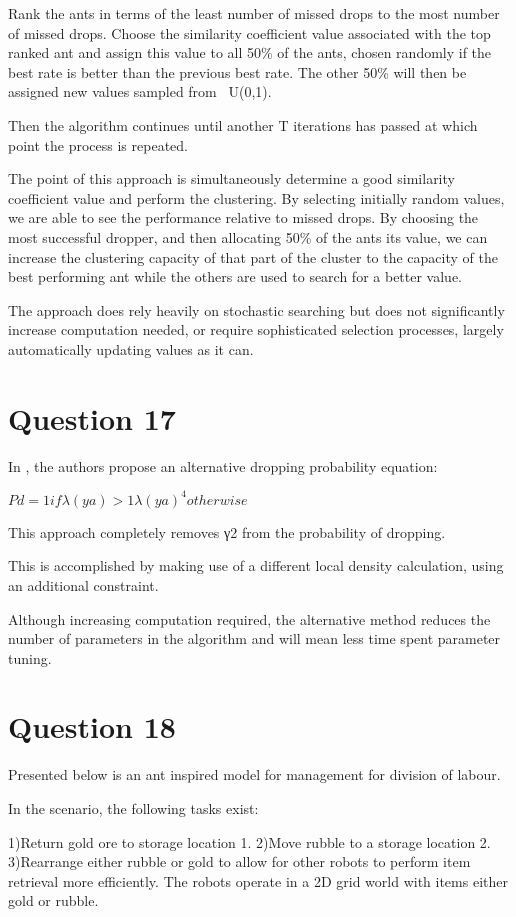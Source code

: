 \documentclass[12pt]{article}
\begin{document}
	Rank the ants in terms of the least number of missed drops to the most number of missed drops. Choose the similarity coefficient value associated with the top ranked ant and assign this value to all 50\% of the ants, chosen randomly if the best rate is better than the previous best rate. The other 50\% will then be assigned new values sampled from ~U(0,1).

	Then the algorithm continues until another T iterations has passed at which point the process is repeated.

	The point of this approach is simultaneously determine a good similarity coefficient value and perform the clustering. By selecting initially random values, we are able to see the performance relative to missed drops. By choosing the most successful dropper, and then allocating 50\% of the ants its value, we can increase the clustering capacity of that part of the cluster to the capacity of the best performing ant while the others are used to search for a better value.

	The approach does rely heavily on stochastic searching but does not significantly increase computation needed, or require sophisticated selection processes, largely automatically updating values as it can.
\section{Question 17}
In \cite{Handl03ant-basedclustering}, the authors propose an alternative dropping probability equation:

	$Pd={1         if λ(ya)>1
	    λ(ya)^4   otherwise
	}$

	This approach completely removes γ2 from the probability of dropping. 

	This is accomplished by making use of a different local density calculation, using an additional constraint.

	Although increasing computation required, the alternative method reduces the number of parameters in the algorithm and will mean less time spent parameter tuning.
\section{Question 18}
Presented below is an ant inspired model for management for division of labour.

In the scenario, the following tasks exist:

	1)Return gold ore to storage location 1. 
	2)Move rubble to a storage location 2.  
	3)Rearrange either rubble or gold to allow for other robots to perform item retrieval more efficiently.
The robots operate in a 2D grid world with items either gold or rubble.	
\end{document}
